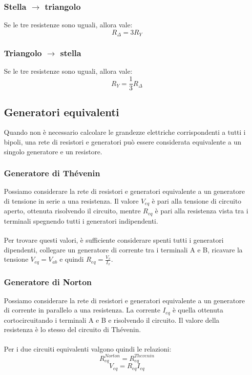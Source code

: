\documentclass{article}
\begin{document}
\subsubsection{Stella $\rightarrow$ triangolo}
Se le tre resistenze sono uguali, allora vale:
$$ R_\Delta=3R_Y $$

\subsubsection{Triangolo $\rightarrow$ stella}
Se le tre resistenze sono uguali, allora vale:
$$ R_Y=\frac{1}{3}R_\Delta $$

\subsection{Generatori equivalenti}
Quando non è necessario calcolare le grandezze elettriche corrispondenti a tutti i bipoli, una rete di resistori e generatori può essere considerata equivalente a un singolo generatore e un resistore.

\subsubsection{Generatore di Thévenin}
Possiamo considerare la rete di resistori e generatori equivalente a un generatore di tensione in serie a una resistenza.
Il valore $V_{eq}$ è pari alla tensione di circuito aperto, ottenuta risolvendo il circuito, mentre $R_{eq}$ è pari alla resistenza vista tra i terminali spegnendo tutti i generatori indipendenti.\\\\
Per trovare questi valori, è sufficiente considerare spenti tutti i generatori dipendenti, collegare un generatore di corrente tra i terminali A e B, ricavare la tensione $V_{eq}=V_{ab}$ e quindi $R_{eq}=\frac{V_x}{I_x}$.

\subsubsection{Generatore di Norton}
Possiamo considerare la rete di resistori e generatori equivalente a un generatore di corrente in parallelo a una resistenza.
La corrente $I_{eq}$ è quella ottenuta cortocircuitando i terminali A e B e risolvendo il circuito. Il valore della resistenza è lo stesso del circuito di Thévenin.\\\\
Per i due circuiti equivalenti valgono quindi le relazioni:
$$ R_{eq}^{Norton} = R_{eq}^{Thevenin}$$
$$ V_{eq} = R_{eq}I_{eq} $$
\end{document}
